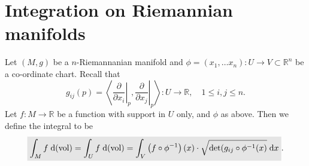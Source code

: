 \documentclass[letter-paper]{tufte-book}
\newcommand{\highlight}[1]{\mathchoice%
  {\colorbox{black!10}{$\displaystyle#1$}}%
  {\colorbox{black!10}{$\textstyle#1$}}%
  {\colorbox{black!10}{$\scriptstyle#1$}}%
  {\colorbox{black!10}{$\scriptscriptstyle#1$}}}%
\begin{document}

\section{Integration on Riemannian manifolds}

Let $(M,g)$ be a $n$-Riemannanian manifold and $\phi = (x_1, \ldots x_n) : U \to V \subset \mathbb{R}^n$ be a co-ordinate chart. Recall that
\begin{equation*}
  g_{ij}(p) = \left\langle \left.\frac{\partial}{\partial x_i}\right|_p, \left.\frac{\partial}{\partial x_j}\right|_p\right\rangle : U \to \mathbb{R}, \quad 1\leq i,j\leq n.
\end{equation*}
Let $f: M \to \mathbb{R}$ be a function with support in $U$ only, and $\phi$ as above. Then we define the integral to be
\begin{equation}
  \highlight{\int_M f\; \mathrm{d}(\mbox{vol}) = \int_U f\; \mathrm{d}(\mbox{vol}) = \int_V \left(f\circ \phi^{-1}\right)(x) \cdot \sqrt{\mbox{det}(g_{ij} \circ \phi^{-1}(x)}\; \mathrm{d}x}.
\end{equation}
\end{document}

